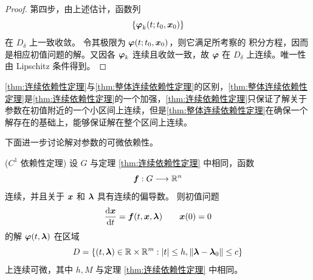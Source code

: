 \begin{proof}
	第四步，由上述估计，函数列
	\[
		\{\boldsymbol{\varphi}_k(t;t_0,\boldsymbol{x}_0)\}
	\]
	在 $D_\delta$ 上一致收敛。
	令其极限为 $\boldsymbol{\varphi}(t;t_0,\boldsymbol{x}_0)$，则它满足所考察的
	积分方程，因而是相应初值问题的解。又因各
	$\boldsymbol{\varphi}_k$ 连续且收敛一致，故
	$\boldsymbol{\varphi}$ 在 $D_\delta$ 上连续。唯一性由 Lipschitz 条件得到。
\end{proof}
\ref{thm:连续依赖性定理}与\ref{thm:整体连续依赖性定理}的区别，\ref{thm:整体连续依赖性定理}是\ref{thm:连续依赖性定理}的一个加强，\ref{thm:连续依赖性定理}只保证了解关于参数在初值附近的一个小区间上连续，但是\ref{thm:整体连续依赖性定理}在确保一个解存在的基础上，能够保证解在整个区间上连续。

下面进一步讨论解对参数的可微依赖性。

\begin{theorem}($C^1$ 依赖性定理)\label{thm:C1依赖性定理}
	设 $G$ 与定理 \ref{thm:连续依赖性定理} 中相同，函数
	\[
		\boldsymbol{f}:G\longrightarrow\mathbb{R}^n
	\]
	连续，并且关于 $\boldsymbol{x}$ 和 $\boldsymbol{\lambda}$ 具有连续的偏导数。
	则初值问题
	\[\frac{\mathrm{d} \boldsymbol{x}}{\mathrm{d} t}=\boldsymbol{f}(t,\boldsymbol{x},\boldsymbol{\lambda})\qquad \boldsymbol{x}(0)=0\]
	的解 $\boldsymbol{\varphi}(t,\boldsymbol{\lambda})$ 在区域
	\[
		D=\left\{
		(t,\boldsymbol{\lambda})\in\mathbb{R}\times\mathbb{R}^m:
		\left| t \right|\leq h,
		\left\| \boldsymbol{\lambda}-\boldsymbol{\lambda}_0 \right\|\leq c
		\right\}
	\]
	上连续可微，其中 $h,M$ 与定理 \ref{thm:连续依赖性定理} 中相同。
\end{theorem}

